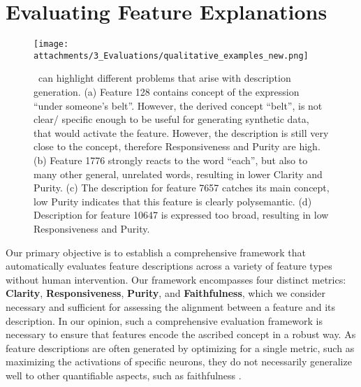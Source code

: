 \section{Evaluating Feature Explanations} \label{sec:methodology}


\begin{figure*}[ht]
    \centering
    \texttt{[image: attachments/3\_Evaluations/qualitative\_examples\_new.png]}
    \caption{ \ours \ can highlight different problems that arise with description generation. (a)
Feature 128 contains concept of the expression ``under someone's belt''. However, the derived concept ``belt'', is not clear/ specific enough to be useful for generating synthetic data, that would activate the feature. However, the description is still very close to the concept, therefore Responsiveness and Purity are high. (b) Feature 1776 strongly reacts to the word ``each'', but also to many other general, unrelated words, resulting in lower Clarity and Purity. (c) The description for feature 7657 catches its main concept, low Purity indicates that this feature is clearly polysemantic. (d)
Description for feature 10647 is expressed too broad, resulting in low Responsiveness and Purity. 
}
    \label{fig:qualitative-examples}
\end{figure*}

Our primary objective is to establish a comprehensive framework that automatically evaluates feature descriptions across a variety of feature types without human intervention. Our framework encompasses four distinct metrics: \textbf{Clarity}, \textbf{Responsiveness}, \textbf{Purity}, and \textbf{Faithfulness}, which we consider necessary and sufficient for assessing the alignment between a feature and its description. In our opinion, such a comprehensive evaluation framework is necessary to ensure that features encode the ascribed concept in a robust way. As feature descriptions are often generated by optimizing for a single metric, such as maximizing the activations of specific neurons, they do not necessarily generalize well to other quantifiable aspects, such as faithfulness \cite{bills2023language, choi2024automatic}.

